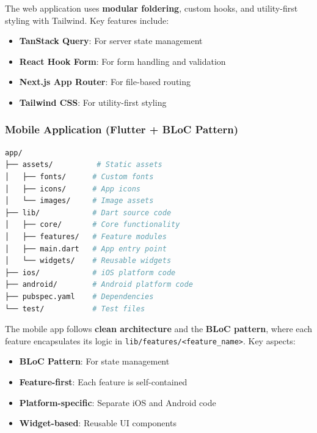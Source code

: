\begin{tcolorbox}[title=Web Architecture]
The web application uses \textbf{modular foldering}, custom hooks, and utility-first styling with Tailwind. Key features include:
\begin{itemize}
    \item \textbf{TanStack Query}: For server state management
    \item \textbf{React Hook Form}: For form handling and validation
    \item \textbf{Next.js App Router}: For file-based routing
    \item \textbf{Tailwind CSS}: For utility-first styling
\end{itemize}
\end{tcolorbox}

\subsubsection{Mobile Application (Flutter + BLoC Pattern)}

\begin{lstlisting}[language=bash, caption={Mobile Application Directory Structure (tree -L 2)}]
app/
├── assets/          # Static assets
│   ├── fonts/      # Custom fonts
│   ├── icons/      # App icons
│   └── images/     # Image assets
├── lib/            # Dart source code
│   ├── core/       # Core functionality
│   ├── features/   # Feature modules
│   ├── main.dart   # App entry point
│   └── widgets/    # Reusable widgets
├── ios/            # iOS platform code
├── android/        # Android platform code
├── pubspec.yaml    # Dependencies
└── test/           # Test files
\end{lstlisting}

\begin{tcolorbox}[title=Mobile Architecture]
The mobile app follows \textbf{clean architecture} and the \textbf{BLoC pattern}, where each feature encapsulates its logic in \texttt{lib/features/<feature\_name>}. Key aspects:
\begin{itemize}
    \item \textbf{BLoC Pattern}: For state management
    \item \textbf{Feature-first}: Each feature is self-contained
    \item \textbf{Platform-specific}: Separate iOS and Android code
    \item \textbf{Widget-based}: Reusable UI components
\end{itemize}
\end{tcolorbox}

